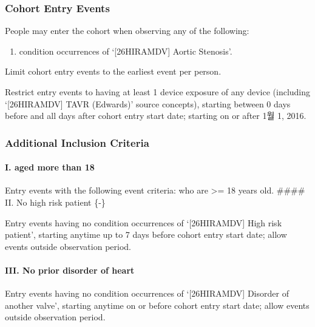 \documentclass[
  12pt,
]{article}
\providecommand{\tightlist}{%
  \setlength{\itemsep}{0pt}\setlength{\parskip}{0pt}}
\begin{document}
\subsubsection{Cohort Entry Events}\label{cohort-entry-events-7}

People may enter the cohort when observing any of the following:

\begin{enumerate}
\def\labelenumi{\arabic{enumi}.}
\tightlist
\item
  condition occurrences of `{[}26HIRAMDV{]} Aortic Stenosis'.
\end{enumerate}

Limit cohort entry events to the earliest event per person.

Restrict entry events to having at least 1 device exposure of any device
(including `{[}26HIRAMDV{]} TAVR (Edwards)' source concepts), starting
between 0 days before and all days after cohort entry start date;
starting on or after 1월 1, 2016.

\subsubsection{Additional Inclusion
Criteria}\label{additional-inclusion-criteria-7}

\paragraph*{I. aged more than 18}\label{i.-aged-more-than-18-5}

Entry events with the following event criteria: who are \textgreater= 18
years old. \#\#\#\# II. No high risk patient \{-\}

Entry events having no condition occurrences of `{[}26HIRAMDV{]} High
risk patient', starting anytime up to 7 days before cohort entry start
date; allow events outside observation period.

\paragraph*{III. No prior disorder of
heart}\label{iii.-no-prior-disorder-of-heart-5}

Entry events having no condition occurrences of `{[}26HIRAMDV{]}
Disorder of another valve', starting anytime on or before cohort entry
start date; allow events outside observation period.
\end{document}

